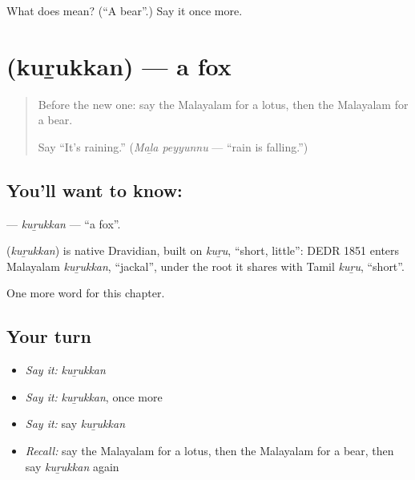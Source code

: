 \begin{tcolorbox}[breakable,colback=teal!4,colframe=teal!35!black,title={Before you move on}]
What does  mean? (\textquotedblleft{}A bear\textquotedblright{}.) Say it once more.
\end{tcolorbox}
\section[\texorpdfstring{\ml{കുറുക്കൻ} (kuṟukkan)}{കുറുക്കൻ (kuṟukkan)}]{ (kuṟukkan) — a fox}

\label{lesson:ML-C162-kurukkan}



\begin{quote}
Before the new one: say the Malayalam for a lotus, then the Malayalam for a bear.

Say \textquotedblleft{}It's raining.\textquotedblright{} (\emph{Maḻa peyyunnu} — \textquotedblleft{}rain is falling.\textquotedblright{})
\end{quote}

\subsection*{You'll want to know: }
\textbf{} — \emph{kuṟukkan} — \textquotedblleft{}a fox\textquotedblright{}.

\begin{cousinweb}
\textbf{} (\emph{kuṟukkan}) is native Dravidian, built on \emph{kuṟu}, \textquotedblleft{}short, little\textquotedblright{}: DEDR 1851 enters Malayalam \emph{kuṟukkan}, \textquotedblleft{}jackal\textquotedblright{}, under the root it shares with Tamil \emph{kuṟu}, \textquotedblleft{}short\textquotedblright{}.
\end{cousinweb}

\begin{grammarlens}[title={What you've built}]
One more word for this chapter.
\end{grammarlens}

\subsection*{Your turn}
\begin{itemize}
\raggedright
  \item \emph{Say it:} \emph{kuṟukkan}
  \item \emph{Say it:} \emph{kuṟukkan}, once more
  \item \emph{Say it:} say \emph{kuṟukkan}
  \item \emph{Recall:} say the Malayalam for a lotus, then the Malayalam for a bear, then say \emph{kuṟukkan} again
\end{itemize}

